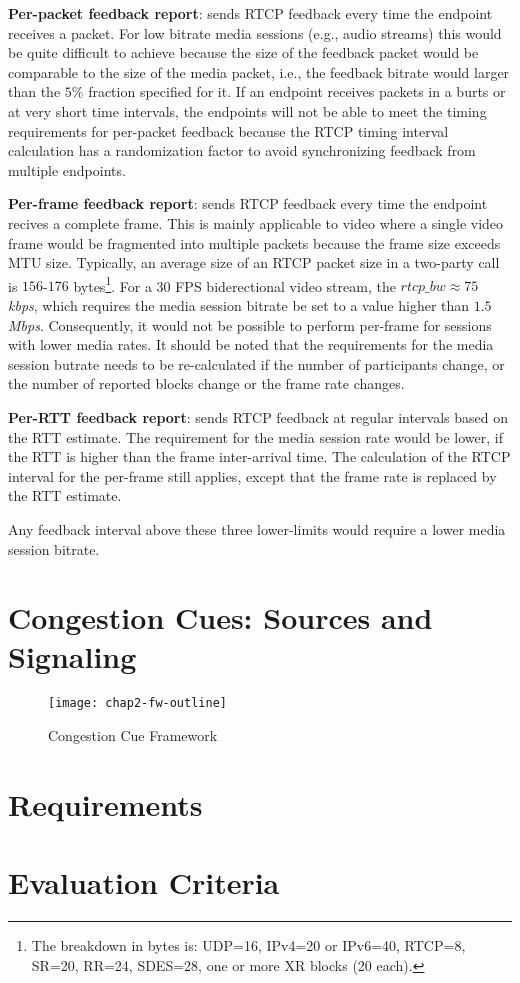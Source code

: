 \textbf{Per-packet feedback report}: sends RTCP feedback every time the
endpoint receives a packet. For low bitrate media sessions (e.g., audio
streams) this would be quite difficult to achieve because the size of the
feedback packet would be comparable to the size of the media packet, i.e., the
feedback bitrate would larger than the $5\%$ fraction specified for it. If an
endpoint receives packets in a burts or at very short time intervals, the
endpoints will not be able to meet the timing requirements for per-packet
feedback because the RTCP timing interval calculation has a randomization
factor to avoid synchronizing feedback from multiple endpoints.

\textbf{Per-frame feedback report}: sends RTCP feedback every time the
endpoint recives a complete frame. This is mainly applicable to video where a
single video frame would be fragmented into multiple packets because the frame
size exceeds MTU size. Typically, an average size of an RTCP packet size in a
two-party call is $156$-$176$ bytes\footnote{The breakdown in bytes is:
UDP=16, IPv4=20 or IPv6=40, RTCP=8, SR=20, RR=24, SDES=28, one or more XR
blocks (20 each).}. For a 30 FPS biderectional video stream, the $rtcp\_bw
\approx 75$ \emph{kbps}, which requires the media session bitrate be set to a
value higher than $1.5$ \emph{Mbps}. Consequently, it would not be possible to
perform per-frame for sessions with lower media rates. It should be noted that
the requirements for the media session butrate needs to be re-calculated if
the number of participants change, or the number of reported blocks change or
the frame rate changes.

\textbf{Per-RTT feedback report}: sends RTCP feedback at regular intervals
based on the RTT estimate. The requirement for the media session rate would be
lower, if the RTT is higher than the frame inter-arrival time. The calculation
of the RTCP interval for the per-frame still applies, except that the frame
rate is replaced by the RTT estimate.

Any feedback interval above these three lower-limits would require a lower
media session bitrate.

\section{Congestion Cues: Sources and Signaling}
\label{fw.fw}


\begin{figure}[!h]
\texttt{[image: chap2-fw-outline]}
\caption{Congestion Cue Framework}
\label{fig:4:fw}
\end{figure}


\section{Requirements}
\label{fw.cc.req}

\section{Evaluation Criteria}
\label{fw.cc.eval}

